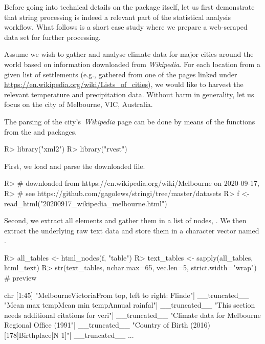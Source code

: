 \documentclass[nojss]{jss}
\begin{document}
Before going into technical details on the  package itself,
let us first demonstrate that string processing is indeed a relevant
part of the statistical analysis workflow.
What follows is a short case study where we prepare a web-scraped
data set for further processing.

Assume we wish to gather and analyse
climate data for major cities around the world based on information
downloaded from \textit{Wikipedia}.
For each location from a given list of settlements (e.g.,
gathered from one of the pages linked under
\url{https://en.wikipedia.org/wiki/Lists_of_cities}),
we would like to harvest the relevant temperature and precipitation data.
Without harm in generality, let us focus on the city of Melbourne,
VIC, Australia.

The parsing of the city's~\textit{Wikipedia} page
can be done by means of the functions from the
 \citep{xml2}
and  \citep{rvest} packages.

\begin{Schunk}
\begin{Sinput}
R> library("xml2")
R> library("rvest")
\end{Sinput}
\end{Schunk}

First, we load and parse the downloaded  file.

\begin{Schunk}
\begin{Sinput}
R> # downloaded from https://en.wikipedia.org/wiki/Melbourne on 2020-09-17,
R> # see https://github.com/gagolews/stringi/tree/master/datasets
R> f <- read_html("20200917_wikipedia_melbourne.html")
\end{Sinput}
\end{Schunk}

Second, we extract all  elements and gather them
in a list of  nodes, .
We then extract the underlying raw text data and store them in a
character vector named .

\begin{Schunk}
\begin{Sinput}
R> all_tables <- html_nodes(f, "table")
R> text_tables <- sapply(all_tables, html_text)
R> str(text_tables, nchar.max=65, vec.len=5, strict.width="wrap") # preview
\end{Sinput}
\begin{Soutput}
chr [1:45] "MelbourneVictoriaFrom top, left to right: Flinde"| __truncated__
   "Mean max temp\n Mean min temp\n Annual rainfal"| __truncated__ "This
   section needs additional citations for veri"| __truncated__ "Climate data
   for Melbourne Regional Office (1991"| __truncated__ "Country of Birth
   (2016)[178]Birthplace[N 1]\nPop"| __truncated__ ...
\end{Soutput}
\end{Schunk}
\end{document}
